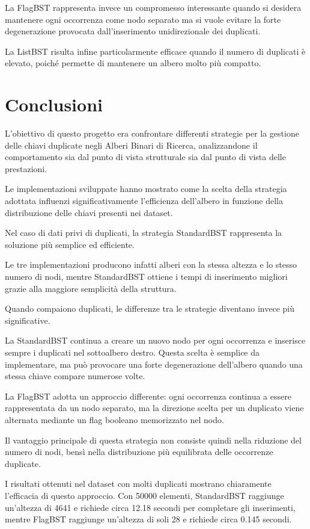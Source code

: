 \documentclass[a4paper,12pt]{article}
\begin{document}
La FlagBST rappresenta invece un compromesso interessante quando si desidera mantenere ogni occorrenza come nodo separato ma si vuole evitare la forte degenerazione provocata dall'inserimento unidirezionale dei duplicati.

La ListBST risulta infine particolarmente efficace quando il numero di duplicati è elevato, poiché permette di mantenere un albero molto più compatto.

\section{Conclusioni}

L'obiettivo di questo progetto era confrontare differenti strategie per la gestione delle chiavi duplicate negli Alberi Binari di Ricerca, analizzandone il comportamento sia dal punto di vista strutturale sia dal punto di vista delle prestazioni.

Le implementazioni sviluppate hanno mostrato come la scelta della strategia adottata influenzi significativamente l'efficienza dell'albero in funzione della distribuzione delle chiavi presenti nei dataset.

Nel caso di dati privi di duplicati, la strategia StandardBST rappresenta la soluzione più semplice ed efficiente.

Le tre implementazioni producono infatti alberi con la stessa altezza e lo stesso numero di nodi, mentre StandardBST ottiene i tempi di inserimento migliori grazie alla maggiore semplicità della struttura.

Quando compaiono duplicati, le differenze tra le strategie diventano invece più significative.

La StandardBST continua a creare un nuovo nodo per ogni occorrenza e inserisce sempre i duplicati nel sottoalbero destro. Questa scelta è semplice da implementare, ma può provocare una forte degenerazione dell'albero quando una stessa chiave compare numerose volte.

La FlagBST adotta un approccio differente: ogni occorrenza continua a essere rappresentata da un nodo separato, ma la direzione scelta per un duplicato viene alternata mediante un flag booleano memorizzato nel nodo.

Il vantaggio principale di questa strategia non consiste quindi nella riduzione del numero di nodi, bensì nella distribuzione più equilibrata delle occorrenze duplicate.

I risultati ottenuti nel dataset con molti duplicati mostrano chiaramente l'efficacia di questo approccio. Con 50000 elementi, StandardBST raggiunge un'altezza di 4641 e richiede circa 12.18 secondi per completare gli inserimenti, mentre FlagBST raggiunge un'altezza di soli 28 e richiede circa 0.145 secondi.
\end{document}
